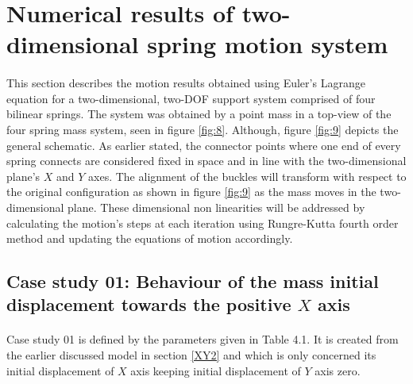 \section{Numerical results of two-dimensional spring motion system}
\paragraph{}

This section describes the motion results obtained using Euler's Lagrange equation for a two-dimensional, two-DOF support system comprised of four bilinear springs. The system was obtained by a point mass in a top-view of the four spring mass system, seen in figure \ref{fig:8}. Although, figure \ref{fig:9} depicts the general schematic. As earlier stated, the connector points where one end of every spring connects are considered fixed in space and in line with the two-dimensional plane's $X$ and $Y$ axes. The alignment of the buckles will transform with respect to the original configuration as shown in figure \ref{fig:9} as the mass moves in the two-dimensional plane. These dimensional non linearities will be addressed by calculating the motion's steps at each iteration using Rungre-Kutta fourth order method and updating the equations of motion accordingly. 

\subsection{Case study 01: Behaviour of the mass initial displacement towards the positive $ X $ axis}
\paragraph{}

Case study 01 is defined by the parameters given in
Table 4.1. It is created from the earlier discussed model in section \ref{XY2} and which is only concerned its initial displacement of $X$ axis keeping initial displacement of $Y$ axis zero. 


